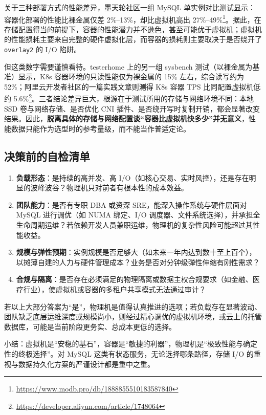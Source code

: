 \documentclass[12pt,UTF8]{ctexbook}
\begin{document}
关于三种部署方式的性能差异，墨天轮社区一组 MySQL 单实例对比测试显示：容器化部署的性能比裸金属仅差 2\%--13\%，却比虚拟机高出 27\%--49\%\footnote{\url{https://www.modb.pro/db/1888855510183587840}}。据此，在存储配置得当的前提下，容器的性能潜力并不逊色，甚至可能优于虚拟机；虚拟机的性能损耗主要来自完整的硬件虚拟化层，而容器的损耗则主要取决于是否绕开了 \texttt{overlay2} 的 I/O 陷阱。

但这类数字需要谨慎看待。testerhome 上的另一组 sysbench 测试（以裸金属为基准）显示，K8s 容器环境的只读性能仅为裸金属的 15\% 左右，综合读写约为 52\%；阿里云开发者社区的一篇实践文章则测得 K8s 容器 TPS 比同配置虚拟机低约 5.6\%\footnote{\url{https://developer.aliyun.com/article/1748064}}。三者结论差异巨大，根源在于测试所用的存储与网络环境不同：本地 SSD 卷与网络存储、是否优化 CNI 插件、是否绕开写时复制开销，都会显著改变结果。因此，\textbf{脱离具体的存储与网络配置谈“容器比虚拟机快多少”并无意义}，性能数据只能作为选型时的参考量级，而不能当作普适定论。

\subsection{决策前的自检清单}

\begin{enumerate}[leftmargin=2cm]
  \item \textbf{负载形态}：是持续的高并发、高 I/O（如核心交易、实时风控），还是存在明显的波峰波谷？物理机只对前者有根本性的成本效益。
  \item \textbf{团队能力}：是否有专职 DBA 或资深 SRE，能深入操作系统与硬件层面对 MySQL 进行调优（如 NUMA 绑定、I/O 调度器、文件系统选择），并承担全生命周期运维？若依赖开发人员兼职运维，物理机的复杂性风险可能超过其性能收益。
  \item \textbf{规模与弹性预期}：实例规模是否足够大（如未来一年内达到数十至上百个），以摊薄自建的人力与硬件管理成本？业务是否对分钟级弹性伸缩有刚性需求？
  \item \textbf{合规与隔离}：是否存在必须满足的物理隔离或数据主权合规要求（如金融、医疗行业），使虚拟机或容器的多租户共享模式无法通过审计？
\end{enumerate}

若以上大部分答案为“是”，物理机是值得认真推进的选项；若负载存在显著波动、团队缺乏底层运维深度或规模尚小，则经过精心调优的虚拟机环境，或云上的托管数据库，可能是当前阶段更务实、总成本更低的选择。

小结：虚拟机是“安稳的基石”，容器是“敏捷的利器”，物理机是“极致性能与确定性的终极选择”。对 MySQL 这类有状态服务，无论选择哪条路径，存储 I/O 的重视与数据持久化方案的严谨设计都是重中之重。
\end{document}
